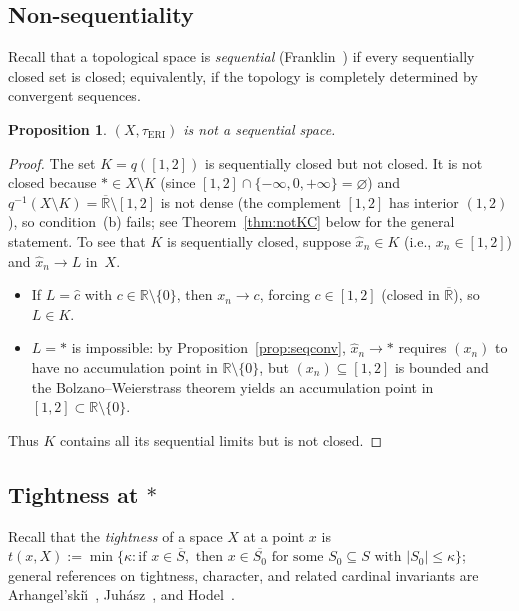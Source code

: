 \documentclass[11pt]{article}
\newtheorem{proposition}[theorem]{Proposition}
\theoremstyle{definition}
\theoremstyle{remark}
\begin{document}
\subsection{Non-sequentiality}

Recall that a topological space is \emph{sequential}
(Franklin~\cite{bib:franklin}) if every sequentially closed set is
closed; equivalently, if the topology is completely determined by
convergent sequences.

\begin{proposition}\label{prop:notsequential}
$(X, \tau_{\mathrm{ERI}})$ is not a sequential space.
\end{proposition}
\begin{proof}
The set $K = q([1,2])$ is sequentially closed but not closed.
It is not closed because $\ast \in X \setminus K$ (since
$[1,2] \cap \{-\infty,0,+\infty\} = \varnothing$) and
$q^{-1}(X \setminus K) = \overline{\mathbb{R}} \setminus [1,2]$ is not
dense (the complement $[1,2]$ has interior $(1,2)$), so condition~(b)
fails; see Theorem~\ref{thm:notKC} below for the general statement.
To see that $K$ is sequentially closed, suppose
$\hat{x}_n \in K$ (i.e., $x_n \in [1,2]$) and $\hat{x}_n \to L$
in~$X$.
\begin{itemize}[nosep]
\item If $L = \hat{c}$ with $c \in \mathbb{R}\setminus\{0\}$, then
  $x_n \to c$, forcing $c \in [1,2]$ (closed in
  $\overline{\mathbb{R}}$), so $L \in K$.
\item $L = \ast$ is impossible: by
  Proposition~\ref{prop:seqconv}, $\hat{x}_n \to \ast$ requires
  $(x_n)$ to have no accumulation point in
  $\mathbb{R}\setminus\{0\}$, but $(x_n) \subseteq [1,2]$ is bounded
  and the Bolzano--Weierstrass theorem yields an accumulation point
  in $[1,2] \subset \mathbb{R}\setminus\{0\}$.
\end{itemize}
Thus $K$ contains all its sequential limits but is not closed.
\end{proof}

\subsection{Tightness at \texorpdfstring{$\ast$}{*}}

Recall that the \emph{tightness} of a space $X$ at a point $x$ is
$t(x, X) := \min\{\kappa : \text{if } x \in \overline{S},
\text{ then } x \in \overline{S_0} \text{ for some }
S_0 \subseteq S \text{ with } |S_0| \leq \kappa\}$; general
references on tightness, character, and related cardinal invariants
are Arhangel'ski\u{\i}~\cite{bib:arhangelskii},
Juh\'{a}sz~\cite{bib:juhasz}, and Hodel~\cite{bib:hodel}.
\end{document}
